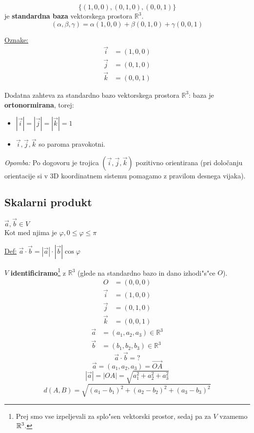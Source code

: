 \[\{(1, 0, 0), (0, 1, 0), (0, 0, 1)\}\] je \textbf{standardna baza} vektorskega prostora \(\mathbb{R}^3\).
\[(\alpha, \beta, \gamma) = \alpha(1, 0, 0) + \beta(0, 1, 0) + \gamma(0, 0, 1)\]

\underline{Oznake:}
\begin{align*}
	\vec{i} &= (1, 0, 0)\\
	\vec{j} &= (0, 1, 0)\\
	\vec{k} &= (0, 0, 1)
\end{align*}

Dodatna zahteva za standardno bazo vektorskega prostora \(\mathbb{R}^3\):
\hspace*{12pt}baza je \textbf{ortonormirana}, torej:
\begin{itemize}
	\item \(|\vec{i}| = |\vec{j}| = |\vec{k}| = 1\)
	\item \(\vec{i}, \vec{j}, \vec{k}\) so paroma pravokotni.
\end{itemize}
\emph{Opomba:} Po dogovoru je trojica $(\vec{i}, \vec{j}, \vec{k})$ pozitivno orientirana (pri določanju orientacije si v 3D koordinatnem sistemu pomagamo z pravilom desnega vijaka).

\subsection{Skalarni produkt}
\(\vec{a}, \vec{b} \in V\)\\
Kot med njima je \(\varphi, 0 \leq \varphi \leq \pi\)

\underline{Def:} \(\vec{a} \cdot \vec{b} = |\vec{a}| \cdot |\vec{b}| \cos\varphi\)

\(V\) \textbf{identificiramo}\footnote{Prej smo vse izpeljevali za splo"sen vektorski prostor, sedaj pa za $V$ vzamemo $\mathbb{R}^3$.} z \(\mathbb{R}^3\) (glede na standardno bazo in dano izhodi"s"ce \(O\)).
\begin{align*}
	O &= (0, 0, 0)\\
	\vec{i} &= (1, 0, 0)\\
	\vec{j} &= (0, 1, 0)\\
	\vec{k} &= (0, 0, 1)
\end{align*}
\begin{align*}
	\vec{a} &= (a_1, a_2, a_3) \in \mathbb{R}^3\\
	\vec{b} &= (b_1, b_2, b_3) \in \mathbb{R}^3
\end{align*}
\[\vec{a} \cdot \vec{b} = ?\]
\[\vec{a} = (a_1, a_2, a_3) = \vec{OA}\]
\[|\vec{a}| = |OA| = \sqrt{a_1^2 + a_2^2 + a_3^2}\]
\[d(A, B) = \sqrt{(a_1 - b_1)^2 + (a_2 - b_2)^2 + (a_3 - b_3)^2}\]

